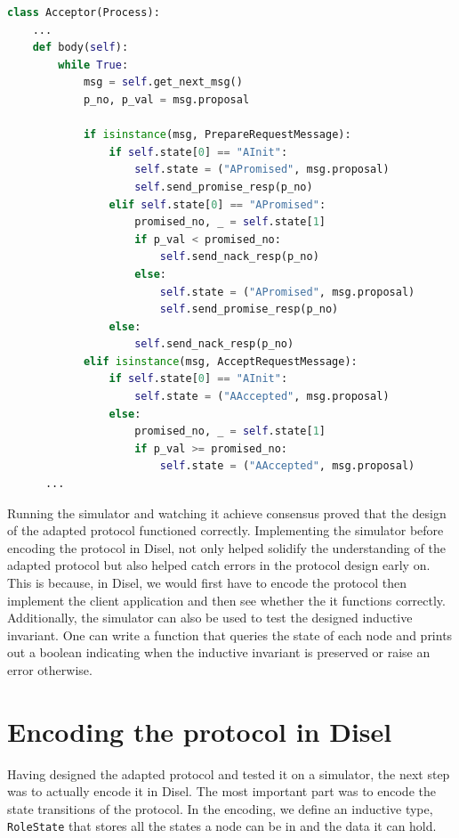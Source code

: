 \begin{lstlisting}[language=Python]
class Acceptor(Process):
    ...
    def body(self):
        while True:
            msg = self.get_next_msg()
            p_no, p_val = msg.proposal

            if isinstance(msg, PrepareRequestMessage):
                if self.state[0] == "AInit":
                    self.state = ("APromised", msg.proposal)
                    self.send_promise_resp(p_no)
                elif self.state[0] == "APromised":
                    promised_no, _ = self.state[1]
                    if p_val < promised_no:
                        self.send_nack_resp(p_no)
                    else:
                        self.state = ("APromised", msg.proposal)
                        self.send_promise_resp(p_no)
                else:
                    self.send_nack_resp(p_no)
            elif isinstance(msg, AcceptRequestMessage):
                if self.state[0] == "AInit":
                    self.state = ("AAccepted", msg.proposal)
                else:
                    promised_no, _ = self.state[1]
                    if p_val >= promised_no:
                        self.state = ("AAccepted", msg.proposal)
      ...
\end{lstlisting}

Running the simulator and watching it achieve consensus proved that the design
of the adapted protocol functioned correctly. Implementing the simulator before
encoding the protocol in Disel, not only helped solidify the understanding
of the adapted protocol but also helped catch errors in the protocol design
early on. This is because, in Disel, we would first have to encode the
protocol then implement the client application and then see whether the it
functions correctly. Additionally, the simulator can also be used to test the
designed inductive invariant. One can write a function that queries the state of
each node and prints out a boolean indicating when the inductive invariant is
preserved or raise an error otherwise.

\section{Encoding the protocol in Disel}
Having designed the adapted protocol and tested it on a simulator, the next
step was to actually encode it in Disel. The most important part was to encode
the state transitions of the protocol. In the encoding, we define an inductive
type, \texttt{RoleState} that stores all the states a node can be in and the
data it can hold.

